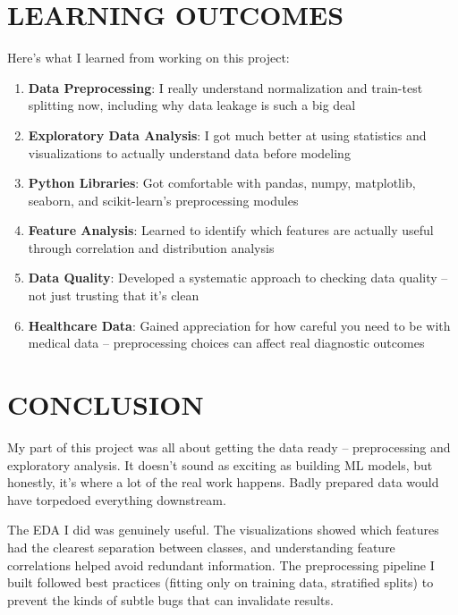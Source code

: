 \documentclass[12pt]{article}
\begin{document}
\newpage
\section{LEARNING OUTCOMES}

Here's what I learned from working on this project:

\begin{enumerate}
    \item \textbf{Data Preprocessing}: I really understand normalization and train-test splitting now, including why data leakage is such a big deal
    
    \item \textbf{Exploratory Data Analysis}: I got much better at using statistics and visualizations to actually understand data before modeling
    
    \item \textbf{Python Libraries}: Got comfortable with pandas, numpy, matplotlib, seaborn, and scikit-learn's preprocessing modules
    
    \item \textbf{Feature Analysis}: Learned to identify which features are actually useful through correlation and distribution analysis
    
    \item \textbf{Data Quality}: Developed a systematic approach to checking data quality -- not just trusting that it's clean
    
    \item \textbf{Healthcare Data}: Gained appreciation for how careful you need to be with medical data -- preprocessing choices can affect real diagnostic outcomes
\end{enumerate}

\newpage
\section{CONCLUSION}

My part of this project was all about getting the data ready -- preprocessing and exploratory analysis. It doesn't sound as exciting as building ML models, but honestly, it's where a lot of the real work happens. Badly prepared data would have torpedoed everything downstream.

The EDA I did was genuinely useful. The visualizations showed which features had the clearest separation between classes, and understanding feature correlations helped avoid redundant information. The preprocessing pipeline I built followed best practices (fitting only on training data, stratified splits) to prevent the kinds of subtle bugs that can invalidate results.
\end{document}
